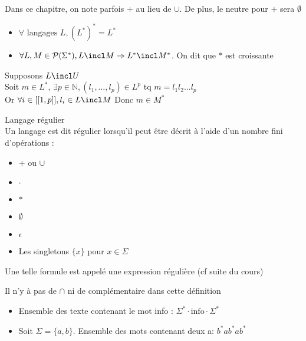 \begin{rmq}
    Dans ce chapitre, on note parfois $+$ au lieu de $\cup$. De plus, le neutre pour $+$ sera $\emptyset$
\end{rmq}

\begin{prop}
    \begin{itemize}
        \item $\forall \text{ langages } L, (L^*)^*=L^*$
        \item $\forall L,M\in \mathcal{P}(\Sigma^*), L\incl M \Rightarrow L^*\incl M^*$. On dit que $*$ est croissante
    \end{itemize}
\end{prop}

\begin{dem}
    Supposons $L\incl U$\\
    Soit $m\in L^*$, $\exists p \in \mathbb{N}, (l_1,\dots,l_p)\in L^p$ tq
    $m=l_1l_2\dots l_p$\\

    Or $\forall i \in [[1,p]], l_i \in L \incl M$
    Donc $m \in M^*$
\end{dem}
    
\begin{defi} Langage régulier\\
    Un langage est dit régulier lorsqu'il peut être décrit à l'aide d'un nombre fini d'opérations :
    \begin{itemize}
        \item $+$ ou $\cup$
        \item $\cdot$
        \item $*$
        \item $\emptyset$
        \item $\epsilon$
        \item Les singletons $\{x\}$ pour $x \in \Sigma$ 
    \end{itemize}
\end{defi}

Une telle formule est appelé une expression régulière (cf suite du cours)\\

\begin{rmq}
    Il n'y à pas de $\cap$ ni de complémentaire dans cette définition
\end{rmq}

\begin{ex}
    \begin{itemize}
        \item Ensemble des texte contenant le mot info : $\Sigma^*\cdot \text{info}\cdot \Sigma^*$
        \item Soit $\Sigma = \{a,b\}$. Ensemble des mots contenant deux a: $b^*ab^*ab^*$
    \end{itemize}
\end{ex}

